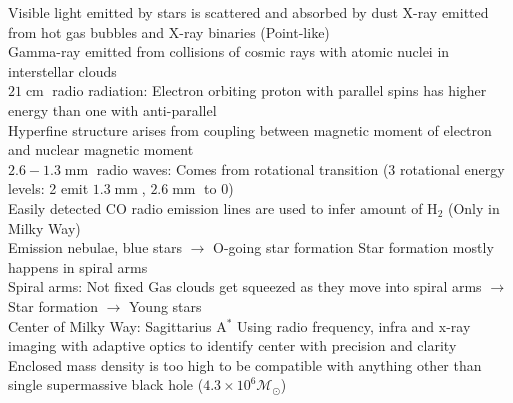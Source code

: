 \documentclass{article}
\DeclareMathOperator{\mm}{mm}
\DeclareMathOperator{\cm}{cm}
\begin{document}
Visible light emitted by stars is scattered and absorbed by dust \quad X-ray emitted from hot gas bubbles and X-ray binaries (Point-like)\\
Gamma-ray emitted from collisions of cosmic rays with atomic nuclei in interstellar clouds\\
$21\cm$ radio radiation: Electron orbiting proton with parallel spins has higher energy than one with anti-parallel\\
Hyperfine structure arises from coupling between magnetic moment of electron and nuclear magnetic moment\\
$2.6-1.3\mm$ radio waves: Comes from rotational transition ($3$ rotational energy levels: 2 emit $1.3\mm$, $2.6\mm$ to 0)\\
Easily detected CO radio emission lines are used to infer amount of H$_{2}$ (Only in Milky Way)\\
Emission nebulae, blue stars $\rightarrow$ O-going star formation \quad Star formation mostly happens in spiral arms\\
Spiral arms: Not fixed \quad Gas clouds get squeezed as they move into spiral arms $\rightarrow$ Star formation $\rightarrow$ Young stars\\
Center of Milky Way: Sagittarius A$^{*}$ \quad Using radio frequency, infra and x-ray imaging with adaptive optics to identify center with precision and clarity\\
Enclosed mass density is too high to be compatible with anything other than single supermassive black hole ($4.3\times 10^{6}\mathcal{M}_{\odot}$)
\end{document}
